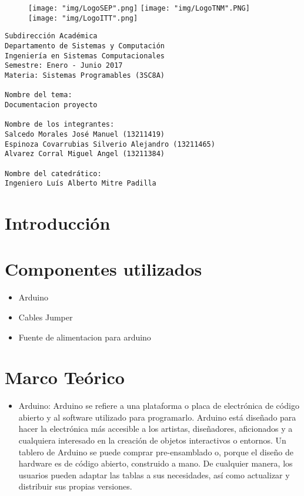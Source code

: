 \documentclass{article}
\begin{document}
\begin{figure}[!htb]
	\texttt{[image: "img/LogoSEP".png]}
\endminipage\hfill
{}
	\texttt{[image: "img/LogoTNM".PNG]}
\endminipage\hfill
{}
	\texttt{[image: "img/LogoITT".png]}
\endminipage\hfill
\end{figure}

\begingroup
\LARGE
\begin{verbatim}
Subdirección Académica
Departamento de Sistemas y Computación
Ingeniería en Sistemas Computacionales
Semestre: Enero - Junio 2017
Materia: Sistemas Programables (3SC8A)

Nombre del tema:
Documentacion proyecto

Nombre de los integrantes:
Salcedo Morales José Manuel (13211419)
Espinoza Covarrubias Silverio Alejandro (13211465)
Alvarez Corral Miguel Angel (13211384)

Nombre del catedrático:
Ingeniero Luís Alberto Mitre Padilla

\end{verbatim}
\endgroup

\newpage
\tableofcontents

\newpage
\section{Introducción}

\section{Componentes utilizados}
\begin{itemize}
        \item Arduino
        \item Cables Jumper
        \item Fuente de alimentacion para arduino
\end{itemize}

\newpage
\section{Marco Teórico}
\begin{itemize}
	\item Arduino: Arduino se refiere a una plataforma o placa de electrónica de código abierto y al software utilizado para programarlo. Arduino está diseñado para hacer la electrónica más accesible a los artistas, diseñadores, aficionados y a cualquiera interesado en la creación de objetos interactivos o entornos. Un tablero de Arduino se puede comprar pre-ensamblado o, porque el diseño de hardware es de código abierto, construido a mano. De cualquier manera, los usuarios pueden adaptar las tablas a sus necesidades, así como actualizar y distribuir sus propias versiones.
\end{itemize}
\end{document}
